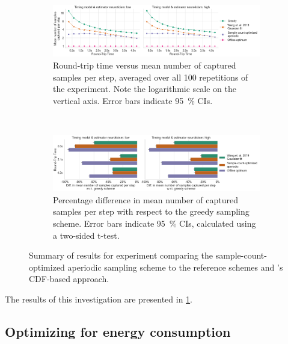\begin{figure}
    \centering
    \begin{subfigure}[t]{\textwidth}
        \centering
        \includegraphics[width=\textwidth]{figs/new_model/sampling_optimization.png}
        \caption{%
            Round-trip time versus mean number of captured samples per step, averaged over all \num{100} repetitions of the experiment.
            Note the logarithmic scale on the vertical axis.
            Error bars indicate \SI{95}{\percent} \acp{CI}.
        }
    \end{subfigure}\\
    \medskip
    \begin{subfigure}[t]{\textwidth}
        \centering
        \includegraphics[width=\textwidth]{figs/new_model/sampling_optimization_diff.png}
        \caption{%
            Percentage difference in mean number of captured samples per step with respect to the greedy sampling scheme.
            Error bars indicate \SI{95}{\percent} \acp{CI}, calculated using a two-sided t-test.
        }
    \end{subfigure}
    \caption{%
        Summary of results for experiment comparing the sample-count-optimized aperiodic sampling scheme to the reference schemes and \textcite{Wang2019Towards}'s \ac{CDF}-based approach.
    }\label{fig:optimization:samples}
\end{figure}

The results of this investigation are presented in \cref{fig:optimization:samples}.

\subsection{Optimizing for energy consumption}\label{ssec:optimization:energy}

